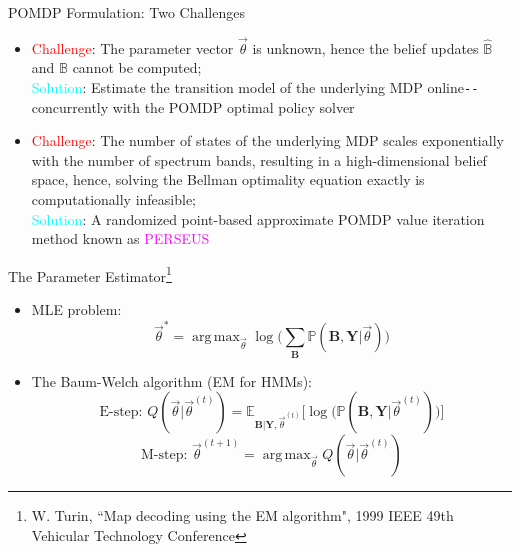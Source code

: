 \documentclass{beamer}
\DeclareMathOperator*{\argmax}{arg\,max}
\begin{document}
\begin{frame}{POMDP Formulation: Two Challenges}
    \begin{itemize}
        \item \textcolor{red}{Challenge}: The parameter vector $\vec{\theta}$ is unknown, hence the belief updates $\hat{\mathbb B}$ and $\mathbb B$ cannot be computed;
        \\\textcolor{cyan}{Solution}: Estimate the transition model of the underlying MDP online\texttt{-{}-}concurrently with the POMDP optimal policy solver
        \item \textcolor{red}{Challenge}: The number of states of the underlying MDP scales exponentially with the number of spectrum bands, resulting in a high-dimensional belief space, hence, solving the Bellman optimality equation exactly is computationally infeasible;
        \\\textcolor{cyan}{Solution}: A randomized point-based approximate POMDP value iteration method known as \textcolor{magenta}{PERSEUS}
    \end{itemize}
\end{frame}
\begin{frame}{The Parameter Estimator\footnote{\tiny{W. Turin, ``Map decoding using the EM algorithm", 1999 IEEE 49th Vehicular Technology Conference}}}
    \begin{itemize}
        \item MLE problem:
        \[\vec{\theta}^{*} = \argmax_{\vec{\theta}} \log\Big(\sum_{\mathbf{B}} \mathbb{P}(\mathbf{B}, \mathbf{Y}| \vec{\theta})\Big)\]
        \item The Baum-Welch algorithm (EM for HMMs):
        \[\text{E-step: }Q(\vec{\theta}|\vec{\theta}^{(t)}) = \mathbb{E}_{\mathbf{B}|\mathbf{Y}, \vec{\theta}^{(t)}} \Big[ \log \Big(\mathbb{P}(\mathbf{B}, \mathbf{Y}|\vec{\theta}^{(t)})\Big)\Big]\]
        \[\text{M-step: }\vec{\theta}^{(t+1)} = \argmax_{\vec{\theta}} Q(\vec{\theta}|\vec{\theta}^{(t)})\]
    \end{itemize}
\end{frame}
\end{document}
